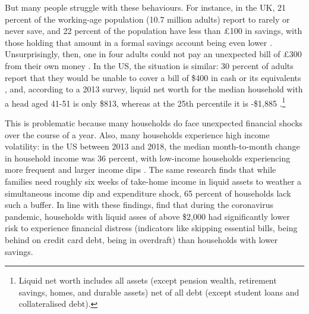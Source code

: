 But many people struggle with these behaviours. For instance, in the UK, 21
percent of the working-age population (10.7 million adults) report to rarely or
never save, and 22 percent of the population have less than \pounds100 in
savings, with those holding that amount in a formal savings account being even
lower \citep{mps2018building}. Unsurprisingly, then, one in four adults could
not pay an unexpected bill of \pounds300 from their own money
\citep{phillips2021supporting}. In the US, the situation is similar: 30 percent
of adults report that they would be unable to cover a bill of \$400 in cash or
its equivalents \citep{fed2022economic}, and, according to a 2013 survey,
liquid net worth for the median household with a head aged 41-51 is only \$813,
whereas at the 25th percentile it is -\$1,885
\citep{beshears2018behavioral}.\footnote{Liquid net worth includes all assets
    (except pension wealth, retirement savings, homes, and durable assets) net
of all debt (except student loans and collateralised debt).}

This is problematic because many households do face unexpected financial shocks
over the course of a year. Also, many households experience high income
volatility: in the US between 2013 and 2018, the median month-to-month change
in household income was 36 percent, with low-income households experiencing
more frequent and larger income dips \citep{jpmorgan2019weathering}. The same
research finds that while families need roughly six weeks of take-home income
in liquid assets to weather a simultaneous income dip and expenditure shock, 65
percent of households lack such a buffer. In line with these findings,
\citet{roll2020income} find that during the coronavirus pandemic, households
with liquid asses of above \$2,000 had significantly lower risk to experience
financial distress (indicators like skipping essential bills, being behind on
credit card debt, being in overdraft) than households with lower savings.

